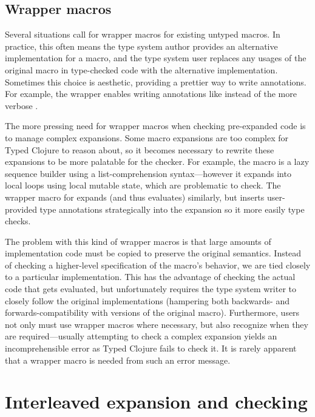 \section{Wrapper macros}

Several situations call for wrapper macros for existing untyped macros.
In practice, this often means the type system author provides an alternative
implementation for a macro, and the type system user
replaces any usages of the original macro in type-checked code with the alternative implementation.
Sometimes this choice is aesthetic, providing a prettier 
way to write annotations. For example, the  wrapper
enables writing annotations like
instead of the more verbose
.

The more pressing need for wrapper macros when checking pre-expanded
code is to manage complex expansions.
Some macro expansions are too complex for Typed Clojure to reason about,
so it becomes necessary to rewrite these expansions to be more palatable
for the checker.
For example, the  macro is a lazy sequence builder using
a list-comprehension syntax---however it expands into local
loops using local mutable state, which are problematic to check.
The wrapper macro for  expands (and thus evaluates) similarly, but inserts user-provided
type annotations strategically into the expansion so it more easily type checks.

The problem with this kind of wrapper macros is that large amounts
of implementation code must be copied to preserve the original semantics.
Instead of checking a higher-level specification of the macro's behavior,
we are tied closely to a particular implementation.
This has the advantage of checking the actual code that gets evaluated, but
unfortunately
requires the type system writer to closely follow the original implementations
(hampering both backwards- and forwards-compatibility with versions of the original macro).
Furthermore, users not only must use wrapper macros where necessary, but
also recognize when they are required---usually attempting to check a complex
expansion yields an incomprehensible error as Typed Clojure fails to check it.
It is rarely apparent that a wrapper macro is needed from such an error message.

\chapter{Interleaved expansion and checking}

